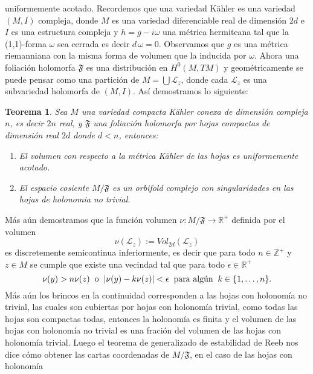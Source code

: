 \documentclass[letterpaper]{report}
\newtheorem{teorema}{Teorema}[chapter]
\newcommand{\zah}{\ensuremath{ \mathbb Z }}
\newcommand{\re}{\ensuremath{\mathbb R }}
\begin{document}
uniformemente acotado. Recordemos que una variedad K\"ahler es una variedad $(M,I)$ compleja, donde $M$ es una variedad 
diferenciable real de dimensi\'on $2d$ e $I$ es una estructura compleja y $h=g-i\omega$ una m\'etrica hermiteana tal que la (1,1)-forma $\omega$ sea cerrada
es decir $d\,\omega=0$. Observamos que $g$ es una m\'etrica riemanniana con la misma forma de volumen que la inducida por $\omega$. Ahora 
una foliaci\'on holomorfa $\mathfrak{F}$ es una distribuci\'on en $H^0(M,TM)$ y geom\'etricamente se puede pensar como una partici\'on 
de $M=\bigcup\mathcal{L}_z$, donde cada $\mathcal{L}_z$ es una subvariedad holomorfa de $(M,I)$. As\'i demostramos lo siguiente:
\begin{teorema}
        Sea $M$ una variedad compacta K\"ahler conexa de dimensi\'on compleja $n$, es decir $2n$ real, y $\mathfrak{F}$ una foliaci\'on holomorfa por hojas
        compactas de dimensi\'on real $2d$ donde $d<n$, entonces:
        \begin{enumerate}
                \item[a)] El volumen con respecto a la m\'etrica K\"ahler de las hojas es uniformemente acotado.
                \item[b)] El espacio cosiente $M/\mathfrak{F}$ es un orbifold complejo con singularidades en las hojas de holonomia no trivial.
        \end{enumerate}
\end{teorema}
M\'as a\'un demostramos que la funci\'on volumen $\nu:M/\mathfrak{F}\rightarrow\re^{+}$ definida por el volumen 
\[
        \nu(\mathcal{L}_z):=Vol_{2d}(\mathcal{L}_z)
\]
es discretemente semicontinua inferiormente, es decir que para todo $n\in\zah^{+}$ y $z\in M$ se cumple que existe una vecindad
tal que para todo $\epsilon\in\re^{+}$ 
\[
        \nu(y)>n\nu(z)\hspace{0.2cm}\text{o}\hspace{0.2cm}|\nu(y)-k\nu(z)|<\epsilon\hspace{0.2cm}\text{para alg\'un}\hspace{0.2cm}k\in\{1,\dots,n\}.
\]
\noindent M\'as a\'un los brincos en la continuidad corresponden a las hojas con holonom\'ia no trivial, las cuales son cubiertas
por hojas con holonom\'ia trivial, como todas las hojas son compactas todas, entonces la holonom\'ia es finita y el volumen de las hojas
con holonom\'ia no trivial es una fraci\'on del volumen de las hojas con holonom\'ia trivial. Luego el teorema de generalizado de 
estabilidad de Reeb \cite{Thurston} nos dice c\'omo obtener las cartas coordenadas de $M/\mathfrak{F}$, en el caso de las hojas con holonom\'ia 
\end{document}
